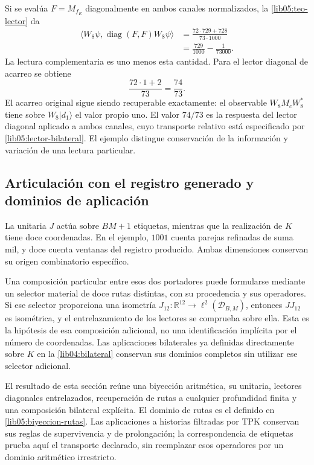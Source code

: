 Si se evalúa \(F=M_{f_E}\) diagonalmente en ambos canales
normalizados, la \cref{lib05:teo-lector} da
\begin{equation}
 \begin{split}
 \langle W_8\psi,\operatorname{diag}(F,F)W_8\psi\rangle
 &=\frac{72\cdot729+728}{73\cdot1000}\\
 &=\frac{729}{1000}-\frac1{73000}.
 \end{split}
 \label{lib05:ejemplo-fraccion}
\end{equation}
La lectura complementaria es uno menos esta cantidad. Para el
lector diagonal de acarreo se obtiene
\begin{equation}
 \frac{72\cdot1+2}{73}=\frac{74}{73}.
 \label{lib05:ejemplo-acarreo}
\end{equation}
El acarreo original sigue siendo recuperable exactamente: el
observable \(W_8M_cW_8^*\) tiene sobre \(W_8|d_1\rangle\)
el valor propio uno. El valor \(74/73\) es la respuesta del
lector diagonal aplicado a ambos canales, cuyo transporte relativo
está especificado por \eqref{lib05:lector-bilateral}. El ejemplo
distingue conservación de la información y variación de una lectura
particular.

\subsection{Articulación con el registro generado y dominios de aplicación}
\label{lib05:dominios}

La unitaria \(J\) actúa sobre \(BM+1\) etiquetas, mientras que
la realización de \(K\) tiene doce coordenadas. En el ejemplo,
\(1001\) cuenta parejas refinadas de suma mil, y doce cuenta
ventanas del registro producido. Ambas dimensiones conservan su
origen combinatorio específico.

Una composición particular entre esos dos portadores puede formularse
mediante un selector material de doce rutas distintas, con su
procedencia y sus operadores. Si ese selector proporciona una
isometría
\(J_{12}:\mathbb R^{12}\to\ell^2(\mathcal D_{B,M})\), entonces
\(JJ_{12}\) es isométrica, y el entrelazamiento de los lectores se
comprueba sobre ella. Esta es la hipótesis de esa composición
adicional, no una identificación implícita por el número de
coordenadas. Las aplicaciones bilaterales ya definidas directamente
sobre \(K\) en la \cref{lib04:bilateral} conservan sus dominios
completos sin utilizar ese selector adicional.

El resultado de esta sección reúne una biyección aritmética, su
unitaria, lectores diagonales entrelazados, recuperación de rutas a
cualquier profundidad finita y una composición bilateral explícita.
El dominio de rutas es el definido en
\eqref{lib05:biyeccion-rutas}. Las aplicaciones a historias
filtradas por TPK conservan sus reglas de supervivencia y de
prolongación; la correspondencia de etiquetas prueba aquí el
transporte declarado, sin reemplazar esos operadores por un dominio
aritmético irrestricto.
